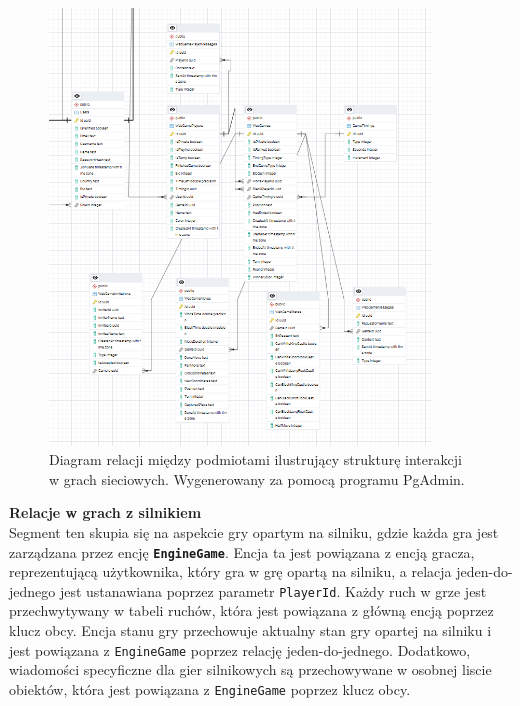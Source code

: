 \documentclass[12pt,a4paper]{article}
\begin{document}
\vspace{0.5cm}
\begin{figure}[h!]
    \centering
    \includegraphics[width=0.9\textwidth]{images/ERD_online.png}
    \caption{Diagram relacji między podmiotami ilustrujący strukturę interakcji w grach sieciowych. Wygenerowany za pomocą programu PgAdmin.}
\end{figure}

\newpage

\noindent \textbf{Relacje w grach z silnikiem}\\
Segment ten skupia się na aspekcie gry opartym na silniku, gdzie każda gra jest zarządzana przez encję \textbf{\texttt{EngineGame}}. Encja ta jest powiązana z encją gracza, reprezentującą użytkownika, który gra w grę opartą na silniku, a relacja jeden-do-jednego jest ustanawiana poprzez parametr \texttt{PlayerId}. Każdy ruch w grze jest przechwytywany w tabeli ruchów, która jest powiązana z główną encją poprzez klucz obcy. Encja stanu gry przechowuje aktualny stan gry opartej na silniku i jest powiązana z \texttt{EngineGame} poprzez relację jeden-do-jednego. Dodatkowo, wiadomości specyficzne dla gier silnikowych są przechowywane w osobnej liscie obiektów, która jest powiązana z \texttt{EngineGame} poprzez klucz obcy.
\end{document}
